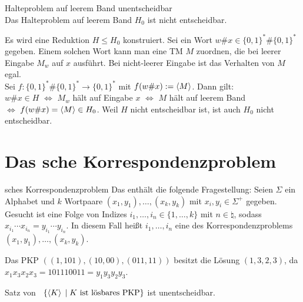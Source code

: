 \begin{Satz}{Halteproblem auf leerem Band unentscheidbar}\\
    Das Halteproblem auf leerem Band $H_0$ ist nicht entscheidbar.
\end{Satz}

\begin{Beweis}
    Es wird eine Reduktion $H \le H_0$ konstruiert.
    Sei ein Wort $w\# x \in \{0, 1\}^\ast \# \{0, 1\}^\ast$ gegeben.
    Einem solchen Wort kann man eine TM $M$ zuordnen,
    die bei leerer Eingabe $M_w$ auf $x$ ausführt.
    Bei nicht-leerer Eingabe ist das Verhalten von $M$ egal.\\
    Sei $f\colon \{0, 1\}^\ast \# \{0, 1\}^\ast \rightarrow \{0, 1\}^\ast$ mit
    $f(w\# x) := \left\langle M\right\rangle$.
    Dann gilt:\\
    $w\# x \in H$ $\iff$
    $M_w$ hält auf Eingabe $x$ $\iff$
    $M$ hält auf leerem Band\\
    $\iff$
    $f(w\# x) = \left\langle M\right\rangle \in H_0$.
    Weil $H$ nicht entscheidbar ist, ist auch $H_0$ nicht entscheidbar.
\end{Beweis}

\pagebreak

\section{%
    Das sche Korrespondenzproblem%
}

\begin{Def}{sches Korrespondenzproblem}
    Das  enthält die folgende Fragestellung:
    Seien $\Sigma$ ein Alphabet und $k$ Wortpaare $(x_1, y_1), \dotsc, (x_k, y_k)$ mit
    $x_i, y_i \in \Sigma^+$ gegeben.
    Gesucht ist eine Folge von Indizes $i_1, \dotsc, i_n \in \{1, \dotsc, k\}$ mit
    $n \in \natural$, sodass  $x_{i_1} \dotsb x_{i_n} = y_{i_1} \dotsb y_{i_n}$.
    In diesem Fall heißt $i_1, \dotsc, i_n$ eine  des Korrespondenzproblems
    $(x_1, y_1), \dotsc, (x_k, y_k)$.
\end{Def}

\begin{Bsp}
    Das PKP $((1, 101), (10, 00), (011, 11))$ besitzt die Lösung
    $(1, 3, 2, 3)$, da $x_1 x_3 x_2 x_3 = 101110011 = y_1 y_3 y_2 y_3$.
\end{Bsp}

\begin{Satz}{Satz von \upshape\,\!}
    $\{\left\langle K\right\rangle \;|\; K \text{ ist lösbares PKP}\}$ ist unentscheidbar.
\end{Satz}

